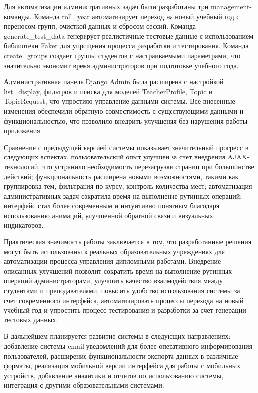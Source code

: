 \documentclass[a4paper,12pt]{article}
\begin{document}
Для автоматизации административных задач были разработаны три management-команды. Команда roll\_year автоматизирует переход на новый учебный год с переносом групп, очисткой данных и сбросом сессий. Команда generate\_test\_data генерирует реалистичные тестовые данные с использованием библиотеки Faker для упрощения процесса разработки и тестирования. Команда create\_groups создает группы студентов с настраиваемыми параметрами, что значительно экономит время администраторов при подготовке учебного года.

Административная панель Django Admin была расширена с настройкой list\_display, фильтров и поиска для моделей TeacherProfile, Topic и TopicRequest, что упростило управление данными системы. Все внесенные изменения обеспечили обратную совместимость с существующими данными и функциональностью, что позволило внедрить улучшения без нарушения работы приложения.

Сравнение с предыдущей версией системы показывает значительный прогресс в следующих аспектах: пользовательский опыт улучшен за счет внедрения AJAX-технологий, что устранило необходимость перезагрузки страниц при большинстве действий; функциональность расширена новыми возможностями, такими как группировка тем, фильтрация по курсу, контроль количества мест; автоматизация административных задач сократила время на выполнение рутинных операций; интерфейс стал более современным и интуитивно понятным благодаря использованию анимаций, улучшенной обратной связи и визуальных индикаторов.

Практическая значимость работы заключается в том, что разработанные решения могут быть использованы в реальных образовательных учреждениях для автоматизации процесса управления дипломными работами. Внедрение описанных улучшений позволит сократить время на выполнение рутинных операций администраторами, улучшить качество взаимодействия между студентами и преподавателями, повысить удобство использования системы за счет современного интерфейса, автоматизировать процессы перехода на новый учебный год и упростить процесс тестирования и разработки за счет генерации тестовых данных.

В дальнейшем планируется развитие системы в следующих направлениях: добавление системы email-уведомлений для более оперативного информирования пользователей, расширение функциональности экспорта данных в различные форматы, реализация мобильной версии интерфейса для работы с мобильных устройств, добавление аналитики и отчетов по использованию системы, интеграция с другими образовательными системами.
\end{document}
